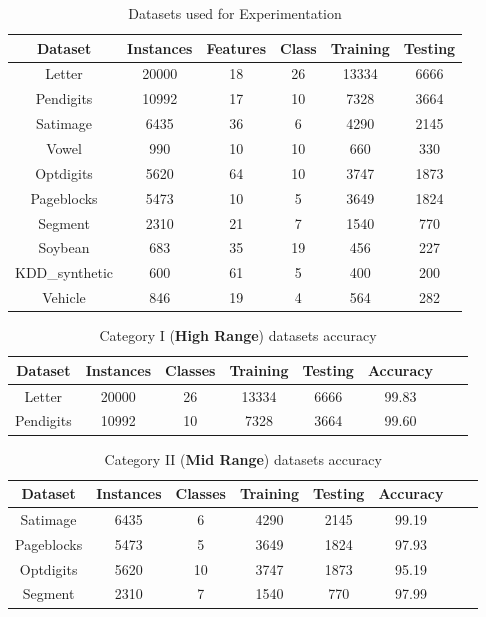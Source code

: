 \documentclass[a4paper, 10pt, conference]{ieeeconf}      %
\begin{document}
\begin{table}[h!]
  \centering
  \caption{Datasets used for Experimentation}
 
  \label{tab:table1}
  \begin{tabular}{|c|c|c|c|c|c|}
   \hline
   \textbf{Dataset} & \textbf{Instances}  & \textbf{Features} & \textbf{Class} 
   & \textbf{Training} & \textbf{Testing} \\
   \hline
   Letter & 20000 & 18 & 26  & 13334 & 6666 \\
    \hline
   Pendigits &10992 & 17 & 10 & 7328 & 3664\\
    \hline
   Satimage & 6435  & 36 & 6 & 4290 & 2145\\
   \hline
   Vowel & 990  & 10 & 10 & 660 & 330\\
   \hline
   Optdigits & 5620 & 64 & 10  & 3747 & 1873\\
   \hline
   Pageblocks & 5473 & 10 & 5 & 3649 & 1824\\
   \hline
   Segment & 2310 & 21 & 7 & 1540 & 770 \\
   \hline
   Soybean & 683  & 35 & 19 & 456 & 227\\
   \hline 
   KDD\_synthetic & 600 & 61 & 5 & 400 & 200\\
   \hline
   Vehicle & 846 & 19 & 4 & 564 & 282 \\
   \hline
  \end{tabular}
\end{table}

\begin{table}[h!]
  \centering
  \caption{Category I (\textbf{High Range}) datasets accuracy}
  \label{tab:table2}
   \begin{tabular}{|c|c|c|c|c|c|c|c|}
   \hline
   \textbf{Dataset} & \textbf{Instances} & \textbf{Classes} & \textbf{Training} & \textbf{Testing} & \textbf{Accuracy}\\
   \hline
   Letter & 20000 & 26  & 13334 & 6666 & 99.83\\
    \hline
   Pendigits &10992 & 10 & 7328 & 3664 & 99.60 \\
    \hline
  \end{tabular}
\end{table}

\begin{table}[h!]
  \centering
  \caption{Category II (\textbf{Mid Range}) datasets accuracy}
  
  \label{tab:table3}
   \begin{tabular}{|c|c|c|c|c|c|c|c|}
   \hline
   \textbf{Dataset} & \textbf{Instances} & \textbf{Classes} & \textbf{Training} & \textbf{Testing} & \textbf{Accuracy}\\
   \hline
   Satimage & 6435 & 6 & 4290 & 2145 & 99.19\\
   \hline
   Pageblocks & 5473 & 5 & 3649 & 1824 & 97.93 \\
   \hline
   Optdigits & 5620 & 10  & 3747 & 1873 & 95.19 \\
   \hline
   Segment & 2310 & 7 & 1540 & 770 & 97.99\\
   \hline
  \end{tabular}
\end{table}
  
\end{document}

